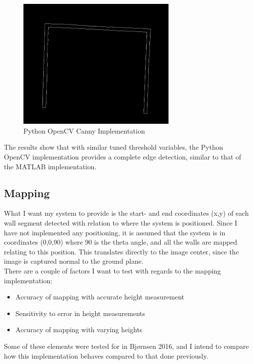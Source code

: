 \begin{figure}[H]
  \centering
  \includegraphics[width=0.7\textwidth]{fig/edge2}
  \caption{Python OpenCV Canny Implementation}
\end{figure}

The results show that with similar tuned threshold variables, the Python OpenCV implementation provides a complete edge detection, similar to that of the MATLAB implementation. 

\subsection{Mapping}
What I want my system to provide is the start- and end coordinates (x,y) of each wall segment detected with relation to where the system is positioned. Since I have not implemented any positioning, it is assumed that the system is in coordinates (0,0,90) where 90 is the theta angle, and all the walls are mapped relating to this position. This translates directly to the image center, since the image is captured normal to the ground plane.\\

There are a couple of factors I want to test with regards to the mapping implementation:
\begin{itemize}
\item Accuracy of mapping with accurate height measurement
\item Sensitivity to error in height measurements
\item Accuracy of mapping with varying heights
\end{itemize}

Some of these elements were tested for in Bjørnsen 2016\cite{kris}, and I intend to compare how this implementation behaves compared to that done previously. 

